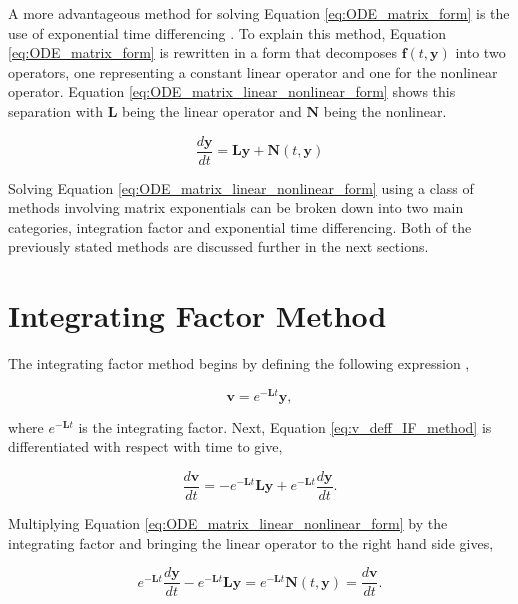 A more advantageous method for solving Equation \ref{eq:ODE_matrix_form} is the use of exponential time differencing  \cite{ash2009} \cite{cox2002} \cite{bratsos2019}. To explain this method, Equation \ref{eq:ODE_matrix_form} is rewritten in a form that decomposes $\boldsymbol{f}(t,\boldsymbol{y})$ into two operators, one representing a constant linear operator and one for the nonlinear operator. Equation \ref{eq:ODE_matrix_linear_nonlinear_form} shows this separation with $\boldsymbol{L}$ being the linear operator and $\boldsymbol{N}$ being the nonlinear.


\begin{equation}
    \frac{d\boldsymbol{y}}{dt} = \boldsymbol{Ly} + \boldsymbol{N}(t,\boldsymbol{y}) 
    \label{eq:ODE_matrix_linear_nonlinear_form}
\end{equation}{}

Solving Equation \ref{eq:ODE_matrix_linear_nonlinear_form} using a class of methods involving matrix exponentials can  be broken down into two main categories, integration factor and exponential time differencing. Both of the previously stated methods are discussed further in the next sections. 

\section{Integrating Factor Method}
The integrating factor method begins by defining the following expression \cite{Kassam2005},

\begin{equation}
    \boldsymbol{v} = e^{-\boldsymbol{L}t}\boldsymbol{y},
    \label{eq:v_deff_IF_method}
\end{equation}{}

\noindent
where $e^{-\boldsymbol{L}t}$ is the integrating factor. Next, Equation \ref{eq:v_deff_IF_method} is differentiated with respect with time to give,

\begin{equation}
    \frac{d\boldsymbol{v}}{dt} = -e^{-\boldsymbol{L}t}\boldsymbol{L}\boldsymbol{y} + e^{-\boldsymbol{L}t} \frac{d\boldsymbol{y}}{dt}.
\end{equation}{}

\noindent
Multiplying Equation \ref{eq:ODE_matrix_linear_nonlinear_form} by the integrating factor and bringing the linear operator to the right hand side gives, 

\begin{equation}
    e^{-\boldsymbol{L}t}\frac{d\boldsymbol{y}}{dt} - e^{-\boldsymbol{L}t}\boldsymbol{L}\boldsymbol{y} = e^{-\boldsymbol{L}t}\boldsymbol{N}(t,\boldsymbol{y}) = \frac{d\boldsymbol{v}}{dt}.
\end{equation}{}

